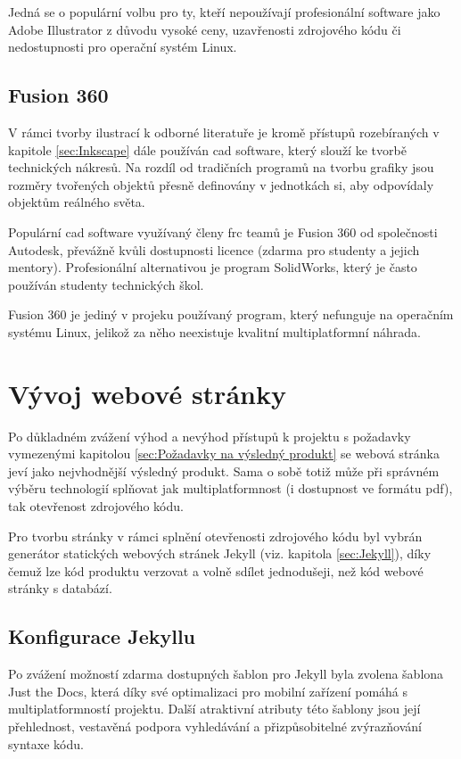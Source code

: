 \documentclass[a4paper, 12pt]{article}
\newcommand*{\fullref}[1]{\hyperref[{#1}]{\ref*{#1}}}
\begin{document}
  Jedná se o populární volbu pro ty, kteří nepoužívají profesionální software jako Adobe Illustrator z důvodu vysoké ceny, uzavřenosti zdrojového kódu či nedostupnosti pro operační systém Linux.


  \subsection{Fusion 360} \label{sec:Fusion 360}
  V rámci tvorby ilustrací k odborné literatuře je kromě přístupů rozebíraných v kapitole \fullref{sec:Inkscape} dále používán \gls{cad} software, který slouží ke tvorbě technických nákresů. Na rozdíl od tradičních programů na tvorbu grafiky jsou rozměry tvořených objektů přesně definovány v jednotkách \gls{si}, aby odpovídaly objektům reálného světa.

  Populární \gls{cad} software využívaný členy \gls{frc} teamů je Fusion 360 od společnosti Autodesk, převážně kvůli dostupnosti licence (zdarma pro studenty a jejich mentory). Profesionální alternativou je program SolidWorks, který je často používán studenty technických škol.

  Fusion 360 je jediný v projeku používaný program, který nefunguje na operačním systému Linux,  jelikož za něho neexistuje kvalitní multiplatformní náhrada.


  \section{Vývoj webové stránky}
  Po důkladném zvážení výhod a nevýhod přístupů k projektu s požadavky vymezenými kapitolou \fullref{sec:Požadavky na výsledný produkt} se webová stránka jeví jako nejvhodnější výsledný produkt. Sama o sobě totiž může při správném výběru technologií splňovat jak multiplatformnost (i dostupnost ve formátu \gls{pdf}), tak otevřenost zdrojového kódu.

  Pro tvorbu stránky v rámci splnění otevřenosti zdrojového kódu byl vybrán generátor statických webových stránek Jekyll (viz. kapitola \fullref{sec:Jekyll}), díky čemuž lze kód produktu verzovat a volně sdílet jednodušeji, než kód webové stránky s databází.


  \subsection{Konfigurace Jekyllu}
  Po zvážení možností zdarma dostupných šablon pro Jekyll byla zvolena šablona Just the Docs, která díky své optimalizaci pro mobilní zařízení pomáhá s multiplatformností projektu. Další atraktivní atributy této šablony jsou její přehlednost, vestavěná podpora vyhledávání a přizpůsobitelné zvýrazňování syntaxe kódu.
\end{document}
